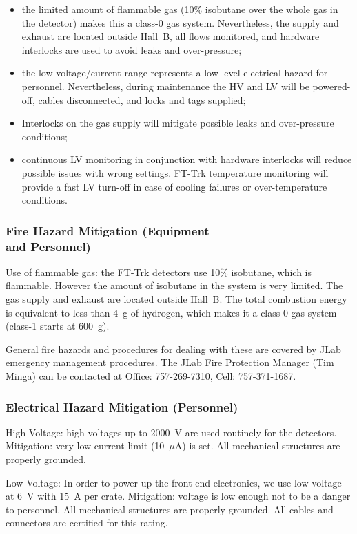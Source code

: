 \begin{itemize}
\item{ the limited amount of flammable gas (10$\%$ isobutane over the whole gas in the detector)  
makes this a class-0 gas system. Nevertheless, the supply and exhaust are located outside 
Hall~B, all flows monitored, and hardware interlocks are used to avoid leaks and over-pressure;}
\item{ the low voltage/current range represents  a low level electrical  hazard for personnel. 
Nevertheless, during maintenance the HV and LV will be powered-off, cables disconnected, and 
locks and tags supplied; }
\item{ Interlocks on the gas supply will mitigate possible leaks and over-pressure conditions;}
\item{ continuous LV monitoring in conjunction with hardware interlocks will reduce possible 
issues with wrong settings. FT-Trk temperature monitoring will provide a fast LV turn-off in 
case of cooling failures or over-temperature conditions. }
\end{itemize}

\subsubsection{Fire Hazard Mitigation (Equipment \\ and Personnel)}

Use of flammable gas: the FT-Trk detectors use 10\% isobutane, which is flammable. 
However the amount of isobutane in the system is very limited. The gas supply and exhaust 
are located outside Hall~B. The total combustion energy is equivalent to less than 4~g of 
hydrogen, which makes it a class-0 gas system (class-1 starts at 600~g). 

General fire hazards and procedures for dealing with these are covered by JLab emergency 
management procedures. The JLab Fire Protection Manager (Tim Minga) can be contacted at 
Office: 757-269-7310, Cell: 757-371-1687.

\subsubsection{Electrical Hazard Mitigation (Personnel)}

High Voltage: high voltages up to 2000~V are used routinely for the detectors. Mitigation: very 
low current limit (10~$\mu$A) is set. All mechanical structures are properly grounded.

Low Voltage: In order to power up the front-end electronics, we use low voltage at 6~V with 15~A 
per crate. Mitigation: voltage is low enough not to be a danger to personnel. All mechanical 
structures are properly grounded. All cables and connectors are certified for this rating.


